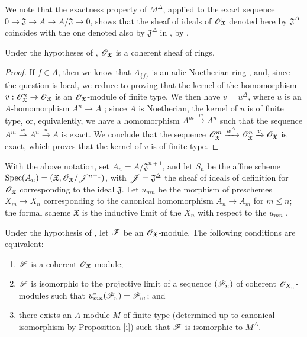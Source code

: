 We note that the exactness property of $M^\Delta$, applied to the exact sequence $0\to\mathfrak{J}\to A\to A/\mathfrak{J}\to 0$, shows that the sheaf of ideals of $\mathscr{O}_\mathfrak{X}$ denoted here by $\mathfrak{J}^\Delta$ coincides with the one denoted also by $\mathfrak{J}^\Delta$ in , by .

\begin{proposition}[10.10.3]
\label{1.10.10.3}
Under the hypotheses of , $\mathscr{O}_\mathfrak{X}$ is a coherent sheaf of rings.
\end{proposition}

\begin{proof}
\label{proof-1.10.10.3}
If $f\in A$, then we know that $A_{\{f\}}$ is an adic Noetherian ring , and, since the question is local, we reduce  to proving that the kernel of the homomorphism $v:\sh{O}_\mathfrak{X}^n\to\sh{O}_\mathfrak{X}$ is an $\mathscr{O}_\mathfrak{X}$-module of finite type.
We then have $v=u^\Delta$, where $u$ is an $A$-homomorphism $A^n\to A$ ; since $A$ is Noetherian, the kernel of $u$ is of finite type, or, equivalently, we have a homomorphism $A^m\xrightarrow{w}A^n$ such that the sequence $A^m\xrightarrow{w}A^n\xrightarrow{u}A$ is exact.
We conclude  that the sequence $\mathscr{O}_\mathfrak{X}^m\xrightarrow{w^\Delta}\mathscr{O}_\mathfrak{X}^n\xrightarrow{v}\mathscr{O}_\mathfrak{X}$ is exact, which proves that the kernel of $v$ is of finite type.
\end{proof}

\begin{env}[10.10.4]
\label{1.10.10.4}
With the above notation, set $A_n=A/\mathfrak{J}^{n+1}$, and let $S_n$ be the affine scheme $\operatorname{Spec}(A_n)=(\mathfrak{X},\mathscr{O}_\mathfrak{X}/\mathscr{J}^{n+1})$, with $\mathscr{J}=\mathfrak{J}^\Delta$ the sheaf of ideals of definition for $\mathscr{O}_\mathfrak{X}$ corresponding to the ideal $\mathfrak{J}$.
Let $u_{mn}$ be the morphism of preschemes $X_m\to X_n$ corresponding to the canonical homomorphism $A_n\to A_m$ for $m\leq n$; the formal scheme $\mathfrak{X}$ is the inductive limit of the $X_n$ with respect to the $u_{mn}$ .
\end{env}

\begin{proposition}[10.10.5]
\label{1.10.10.5}
Under the hypothesis of , let $\mathscr{F}$ be an $\mathscr{O}_\mathfrak{X}$-module.
The following conditions are equivalent:
\begin{enumerate}[label=\emph{(\alph*)}]
  \item $\mathscr{F}$ is a coherent $\mathscr{O}_\mathfrak{X}$-module;
  \item $\mathscr{F}$ is isomorphic to the projective limit  of a sequence $(\mathscr{F}_n)$ of coherent $\mathscr{O}_{X_n}$-modules such that $u_{mn}^*(\mathscr{F}_n)=\mathscr{F}_m$; and
  \item there exists an $A$-module $M$ of finite type (determined up to canonical isomorphism by Proposition [i]) such that $\mathscr{F}$ is isomorphic to $M^\Delta$.
\end{enumerate}
\end{proposition}

